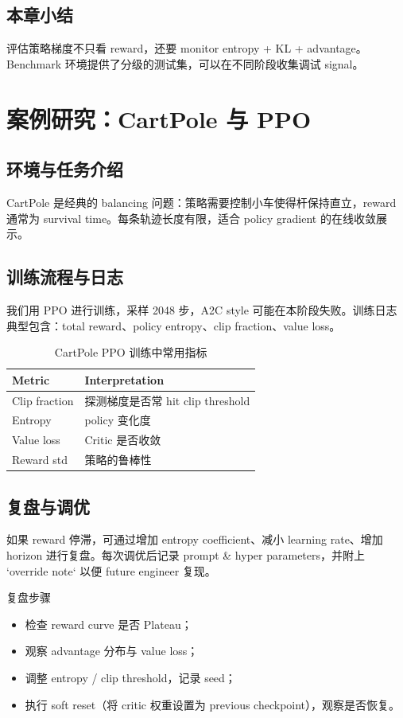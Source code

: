 \documentclass[a4paper]{article}
\begin{document}
\subsection{本章小结}
评估策略梯度不只看 reward，还要 monitor entropy + KL + advantage。Benchmark 环境提供了分级的测试集，可以在不同阶段收集调试 signal。

\section{案例研究：CartPole 与 PPO}
\subsection{环境与任务介绍}
CartPole 是经典的 balancing 问题：策略需要控制小车使得杆保持直立，reward 通常为 survival time。每条轨迹长度有限，适合 policy gradient 的在线收敛展示。

\subsection{训练流程与日志}
我们用 PPO 进行训练，采样 2048 步，A2C style 可能在本阶段失败。训练日志典型包含：total reward、policy entropy、clip fraction、value loss。
\begin{table}[H]
\centering
\small
\begin{tabular}{p{}p{}}
\toprule
Metric & Interpretation \\
\midrule
Clip fraction & 探测梯度是否常 hit clip threshold \\
Entropy & policy 变化度 \\
Value loss & Critic 是否收敛 \\
Reward std & 策略的鲁棒性 \\
\bottomrule
\end{tabular}
\caption{CartPole PPO 训练中常用指标}
\end{table}

\subsection{复盘与调优}
如果 reward 停滞，可通过增加 entropy coefficient、减小 learning rate、增加 horizon 进行复盘。每次调优后记录 prompt \& hyper parameters，并附上 `override note` 以便 future engineer 复现。

\begin{knowledgebox}{复盘步骤}
\begin{itemize}
    \item 检查 reward curve 是否 Plateau；
    \item 观察 advantage 分布与 value loss；
\item 调整 entropy / clip threshold，记录 seed；
\item 执行 soft reset（将 critic 权重设置为 previous checkpoint），观察是否恢复。
\end{itemize}
\end{knowledgebox}
\end{document}
